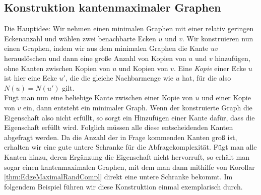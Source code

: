 \documentclass[10pt,a4paper, footheight=1mm, bibliography=totoc]{scrreprt}
\theoremstyle{definition}
\begin{document}
\subsection{Konstruktion kantenmaximaler Graphen}
Die Hauptidee: Wir nehmen einen minimalen Graphen mit einer
relativ geringen Eckenanzahl und wählen zwei benachbarte Ecken
$u$ und $v$. Wir konstruieren nun einen Graphen, indem wir aus dem
minimalen Graphen die Kante $uv$ herauslöschen und dann eine große
Anzahl von Kopien von $u$ und $v$ hinzufügen, ohne Kanten zwischen
Kopien von $u$ und Kopien von $v$.
Eine \emph{Kopie} einer Ecke $u$ ist hier
eine Ecke $u'$, die die gleiche Nachbarmenge wie $u$ hat, für
die also $N(u)=N(u')$ gilt.\\
Fügt man nun eine beliebige Kante zwischen einer Kopie von $u$ und einer
Kopie von $v$ ein, dann entsteht ein minimaler Graph. Wenn der
konstruierte Graph die Eigenschaft also nicht erfüllt, so sorgt 
ein Hinzufügen einer Kante dafür, dass die Eigenschaft erfüllt wird.
Folglich müssen alle diese entscheidenden Kanten abgefragt werden.
Da die Anzahl der in Frage kommenden Kanten groß ist, erhalten
wir eine gute untere Schranke für die Abfragekomplexität.
Fügt man alle Kanten hinzu, deren Ergänzung die Eigenschaft
nicht hervorruft, so erhält man sogar einen kantenmaximalen Graphen,
mit dem man dann mithilfe von Korollar \ref{thm:EdgeMaximalRandCompl}
direkt eine untere Schranke bekommt.
Im folgendem Beispiel führen wir diese Konstruktion einmal
exemplarisch durch.
\end{document}
